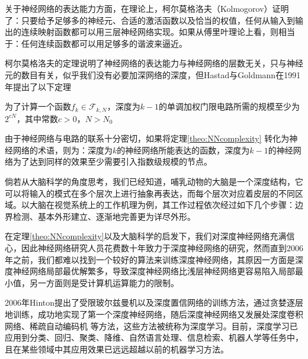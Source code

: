 关于神经网络的表达能力方面，在理论上，柯尔莫格洛夫（Kolmogorov）证明了：只要给予足够多的神经元、合适的激活函数以及恰当的权值，任何从输入到输出的连续映射函数都可以用三层神经网络实现。如果从傅里叶理论上看，则相当于：任何连续函数都可以用足够多的谐波来逼近。

柯尔莫格洛夫的定理说明了神经网络的表达能力与神经网络的层数无关，只与神经元的数目有关，似乎我们没有必要加深网络的深度，但Hastad与Goldmann在1991年提出了以下定理

\begin{theorem}\label{theo:NNcomplexity}
为了计算一个函数$f_k \in \mathcal{F}_{k, N}$，深度为$k-1$的单调加权门限电路所需的规模至少为$2^{cN}$，其中常数$c>0$，$N>N_0$
\end{theorem}

由于神经网络与电路的联系十分密切，如果将定理\ref{theo:NNcomplexity} 转化为神经网络的术语，则为：深度为$k$的神经网络所能表达的函数，深度为$k-1$的神经网络为了达到同样的效果至少需要引入指数级规模的节点。

倘若从大脑科学的角度思考，我们已经知道，哺乳动物的大脑是一个深度结构，它可以将输入的模式在多个层次上进行抽象再表达，而每个层次对应着皮层的不同区域。以大脑在视觉系统上的工作机理为例，其工作过程依次经过如下几个步骤：边界检测、基本外形建立、逐渐地完善更为详尽外形。

在定理\ref{theo:NNcomplexity}以及大脑科学的启发下，我们对深度神经网络充满信心，因此神经网络研究人员花费数十年致力于深度神经网络的研究，然而直到2006年之前，我们都难以找到一个较好的算法来训练深度神经网络，其原因一方面是深度神经网络局部最优解繁多，导致深度神经网络比浅层神经网络更容易陷入局部最小值，另一方面则是受计算机运算能力的限制。

2006年Hinton提出了受限玻尔兹曼机以及深度置信网络的训练方法，通过贪婪逐层地训练，成功地实现了第一个深度神经网络，随后深度神经网络又发展处深度卷积网络、稀疏自动编码机 等方法，这些方法被统称为深度学习。目前，深度学习已应用到分类、回归、聚类、降维、自然语言处理、信息检索、机器人学等任务中，且在某些领域中其应用效果已远远超越以前的机器学习方法。



